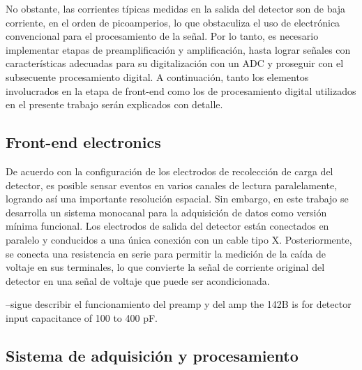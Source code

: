 \documentclass[]{book}
\begin{document}
\noindent No obstante, las corrientes típicas medidas en la salida del detector son de baja corriente, en el orden de picoamperios, lo que obstaculiza el uso de electrónica convencional para el procesamiento de la señal. Por lo tanto, es necesario implementar etapas de preamplificación y amplificación, hasta lograr señales con características adecuadas para su digitalización con un ADC y proseguir con el subsecuente procesamiento digital. A continuación, tanto los elementos involucrados en la etapa de front-end como los de procesamiento digital utilizados en el presente trabajo serán explicados con detalle.

\subsection*{Front-end electronics}

\noindent De acuerdo con la configuración de los electrodos de recolección de carga del detector, es posible sensar eventos en varios canales de lectura paralelamente, logrando así una importante resolución espacial. Sin embargo, en este trabajo se desarrolla un sistema monocanal para la adquisición de datos como versión mínima funcional. Los electrodos de salida del detector están conectados en paralelo y conducidos a una única conexión con un cable tipo X. Posteriormente, se conecta una resistencia en serie para permitir la medición de la caída de voltaje en sus terminales, lo que convierte la señal de corriente original del detector en una señal de voltaje que puede ser acondicionada.

--sigue describir el funcionamiento del preamp y del amp
the 142B is for detector input capacitance of 100 to 400 pF.


\subsection*{Sistema de adquisición y procesamiento}

\noindent 
\end{document}
